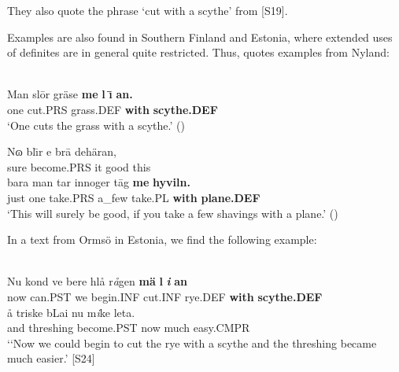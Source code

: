 \ea 
	\z 
\z

They also quote the phrase  ‘cut with a scythe’ from [S19]. 

Examples are also found in Southern Finland and Estonia, where extended uses of definites are in general quite restricted. Thus, \citet{Lundström1939} quotes examples from Nyland:

\ea\label{}
\\
\gll Man  sl\=or  gräse  \textbf{me} \textbf{l} \textbf{\={\i}} \textbf{an.}\\
one  cut.PRS  grass.DEF  \textbf{with} \textbf{scythe.DEF}\\
\glt ‘One cuts the grass with a scythe.’ (\citet[15]{Lundström1939})

\z

\ea
\gll Nɷ  bl\={\i}r  e  br\=a  dehäran,\\
sure  become.PRS  it  good  this\\
\gll bara  man  tar  innoger  t\=ag  \textbf{me} \textbf{hyviln.}\\
just  one  take.PRS  a\_few  take.PL  \textbf{with} \textbf{plane.DEF}\\
\glt ‘This will surely be good, if you take a few shavings with a plane.’ (\citet[15]{Lundström1939})

\z

In a text from Ormsö in Estonia, we find the following example:

\ea \label{} 
\\
\gll Nu  kond  ve  bere  hlå  r\textit{å}gen  \textbf{mä} \textbf{l} \textbf{\textit{i}} \textbf{an}\\
now  can.PST  we  begin.INF  cut.INF  rye.DEF  \textbf{with} \textbf{scythe.DEF}\\
\gll å  triske  bLai  nu  m\textit{i}ke  leta.\\
and  threshing  become.PST  now  much   easy.CMPR\\
\glt ‘‘Now we could begin to cut the rye with a scythe and the threshing became much easier.’ [S24]

